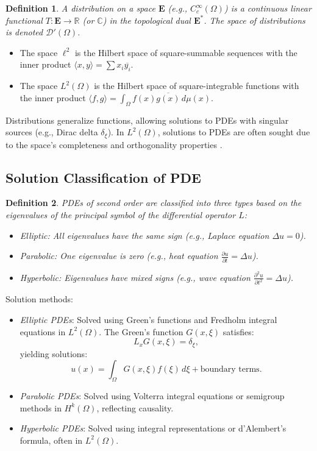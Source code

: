 \documentclass{article}
\theoremstyle{plain}
\newtheorem{definition}{Definition}[section]
\newcommand{\cat}[1]{\mathbf{#1}}
\begin{document}
\begin{definition}
A \emph{distribution} on a space \(\cat{E}\) (e.g., \(C^\infty_c(\Omega)\)) is a continuous linear functional \(T: \cat{E} \to \mathbb{R}\) (or \(\mathbb{C}\)) in the topological dual \(\cat{E}^*\). The space of distributions is denoted \(\mathcal{D}'(\Omega)\).
\end{definition}

\begin{itemize}
    \item The space \(\ell^2\) is the Hilbert space of square-summable sequences with the inner product \(\langle x, y \rangle = \sum x_i \overline{y_i}\).
    \item The space \(L^2(\Omega)\) is the Hilbert space of square-integrable functions with the inner product \(\langle f, g \rangle = \int_\Omega f(x) \overline{g(x)} \, d\mu(x)\).
\end{itemize}

Distributions generalize functions, allowing solutions to PDEs with singular sources (e.g., Dirac delta \(\delta_\xi\)). In \(L^2(\Omega)\), solutions to PDEs are often sought due to the space's completeness and orthogonality properties \cite{nLab_distributions}.

\subsection{Solution Classification of PDE}

\begin{definition}
PDEs of second order are classified into three types based on the eigenvalues
of the principal symbol of the differential operator \(L\):
\begin{itemize}
    \item \emph{Elliptic}: All eigenvalues have the same sign (e.g., Laplace equation \(\Delta u = 0\)).
    \item \emph{Parabolic}: One eigenvalue is zero (e.g., heat equation \(\frac{\partial u}{\partial t} = \Delta u\)).
    \item \emph{Hyperbolic}: Eigenvalues have mixed signs (e.g., wave equation \(\frac{\partial^2 u}{\partial t^2} = \Delta u\)).
\end{itemize}
\end{definition}

Solution methods:
\begin{itemize}
    \item \emph{Elliptic PDEs}: Solved using Green's functions and Fredholm integral equations in \(L^2(\Omega)\). The Green's function \(G(x, \xi)\) satisfies: \[ L_x G(x, \xi) = \delta_\xi, \] yielding solutions: \[ u(x) = \int_\Omega G(x, \xi) f(\xi) \, d\xi + \text{boundary terms}. \]
    \item \emph{Parabolic PDEs}: Solved using Volterra integral equations or semigroup methods in \(H^k(\Omega)\), reflecting causality.
    \item \emph{Hyperbolic PDEs}: Solved using integral representations or d'Alembert's formula, often in \(L^2(\Omega)\).
\end{itemize}
\end{document}
